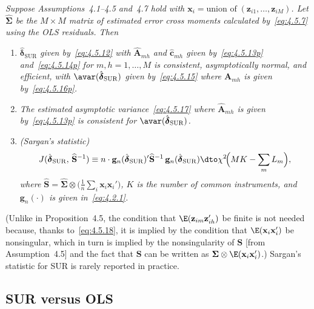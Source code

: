 \begin{proposition}
\label{prop:4.6}
\textit{Suppose Assumptions~4.1--4.5 and~4.7 hold with
$\mathbf{x}_i = \text{union of}\; (\mathbf{z}_{i1}, \ldots, \mathbf{z}_{iM})$.
Let\/ $\widehat{\boldsymbol{\Sigma}}$ be the $M \times M$ matrix of estimated error
cross moments calculated by~\eqref{eq:4.5.7} using the OLS residuals. Then}
\begin{enumerate}[label=(\alph*)]
\item $\hat{\boldsymbol{\delta}}_{\mathrm{SUR}}$ \textit{given by~\eqref{eq:4.5.12}
with\/ $\widehat{\mathbf{A}}_{mh}$ and\/ $\hat{\mathbf{c}}_{mh}$ given
by~\eqref{eq:4.5.13p} and~\eqref{eq:4.5.14p} for
$m, h = 1, \ldots, M$ is consistent, asymptotically normal, and efficient, with\/
$\avar(\hat{\boldsymbol{\delta}}_{\mathrm{SUR}})$ given by~\eqref{eq:4.5.15}
where\/ $\mathbf{A}_{mh}$ is given by~\eqref{eq:4.5.16p}.}

\item \textit{The estimated asymptotic variance~\eqref{eq:4.5.17} where\/
$\widehat{\mathbf{A}}_{mh}$ is given by~\eqref{eq:4.5.13p} is consistent for\/
$\avar(\hat{\boldsymbol{\delta}}_{\mathrm{SUR}})$.}

\item \textit{(Sargan's statistic)}
\[
J(\hat{\boldsymbol{\delta}}_{\mathrm{SUR}},\, \widehat{\mathbf{S}}^{-1})
\equiv n \cdot \mathbf{g}_n(\hat{\boldsymbol{\delta}}_{\mathrm{SUR}})'
\widehat{\mathbf{S}}^{-1}\, \mathbf{g}_n(\hat{\boldsymbol{\delta}}_{\mathrm{SUR}})
\dto \chi^2\!\Bigl(MK - \sum_m L_m\Bigr),
\]
\textit{where\/ $\widehat{\mathbf{S}} = \widehat{\boldsymbol{\Sigma}} \otimes
\bigl(\frac{1}{n} \sum_i \mathbf{x}_i \mathbf{x}_i'\bigr)$,
$K$ is the number of common instruments, and\/ $\mathbf{g}_n(\cdot)$ is given
in~\eqref{eq:4.2.1}.}
\end{enumerate}
\end{proposition}

(Unlike in Proposition~4.5, the condition that $\E(\mathbf{z}_{im} \mathbf{z}_{ih}')$
be finite is not needed because, thanks to~\eqref{eq:4.5.18}, it is implied by the
condition that $\E(\mathbf{x}_i \mathbf{x}_i')$ be nonsingular, which in turn is implied
by the nonsingularity of $\mathbf{S}$ [from Assumption~4.5] and the fact that
$\mathbf{S}$ can be written as $\boldsymbol{\Sigma} \otimes \E(\mathbf{x}_i \mathbf{x}_i')$.)
Sargan's statistic for SUR is rarely reported in practice.

\subsection*{SUR versus OLS}

